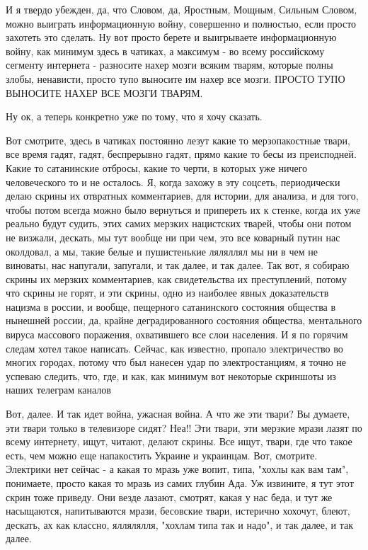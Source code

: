 И я твердо убежден, да, что Словом, да, Яростным, Мощным, Сильным Словом, можно
выиграть информационную войну, совершенно и полностью, если просто захотеть это
сделать. Ну вот просто берете и выигрываете информационную войну, как минимум
здесь в чатиках, а максимум - во всему российскому сегменту интернета -
разносите нахер мозги всяким тварям, которые полны злобы, ненависти, просто
тупо выносите им нахер все мозги. ПРОСТО ТУПО ВЫНОСИТЕ НАХЕР ВСЕ МОЗГИ ТВАРЯМ.

Ну ок, а теперь конкретно уже по тому, что я хочу сказать.

Вот смотрите, здесь в чатиках постоянно лезут какие то мерзопакостные твари,
все время гадят, гадят, беспрерывно гадят, прямо какие то бесы из преисподней.
Какие то сатанинские отбросы, какие то черти, в которых уже ничего
человеческого то и не осталось.  Я, когда захожу в эту соцсеть, периодически
делаю скрины их отвратных комментариев, для истории, для анализа, и для того,
чтобы потом всегда можно было вернуться и припереть их к стенке, когда их уже
реально будут судить, этих самих мерзких нацистских тварей, чтобы они потом не
визжали, дескать, мы тут вообще ни при чем, это все коварный путин нас
околдовал, а мы, такие белые и пушистенькие ляляллял мы ни в чем не виноваты,
нас напугали, запугали, и так далее, и так далее. Так вот, я собираю скрины их
мерзких комментариев, как свидетельства их преступлений, потому что скрины не
горят, и эти скрины, одно из наиболее явных доказательств нацизма в россии, и
вообще, пещерного сатанинского состояния общества в нынешней россии, да, крайне
деградированного состояния общества, ментального вируса массового поражения,
охватившего все слои населения. И я по горячим следам хотел такое написать.
Сейчас, как известно, пропало электричество во многих городах, потому что был
нанесен удар по электростанциям, я точно не успеваю следить, что, где, и как,
как минимум вот некоторые скриншоты из наших телеграм каналов

Вот, далее. И так идет война, ужасная война. А что же эти твари? Вы думаете,
эти твари только в телевизоре сидят? Неа!! Эти твари, эти мерзкие мрази лазят
по всему интернету, ищут, читают, делают скрины. Все ищут, твари, где что такое
есть, чем можно еще напакостить Украине и украинцам. Вот, смотрите. Электрики
нет сейчас - а какая то мразь уже вопит, типа, "хохлы как вам там", понимаете,
просто какая то мразь из самих глубин Ада. Уж извините, я тут этот скрин тоже
приведу. Они везде лазают, смотрят, какая у нас беда, и тут же насыщаются,
напитываются мрази, бесовские твари, истерично хохочут, блеют, дескать, ах как
классно, яллялялля, "хохлам типа так и надо", и так далее, и так далее. 

